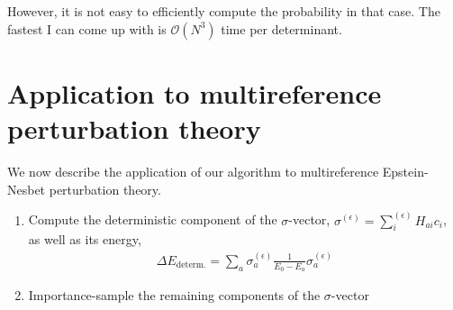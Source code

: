 \documentclass[english]{article}
\begin{document}
However, it is not easy to efficiently compute the probability in that case. The fastest I can come up with is $\mathcal{O}(N^3)$ time per determinant.


\section{Application to multireference perturbation theory}
We now describe the application of our algorithm to multireference Epstein-Nesbet perturbation theory. 

\begin{enumerate}
	\item Compute the deterministic component of the $\sigma$-vector, $\sigma^{(\epsilon)} = \sum^{(\epsilon)}_i H_{ai} c_i$, as well as its energy,
	\begin{eqnarray}
		\Delta E_{\textrm{determ.}} = \sum_a \sigma^{(\epsilon)}_a \frac{1}{E_0 - E_a} \sigma^{(\epsilon)}_a
	\end{eqnarray}
	\item Importance-sample the remaining components of the $\sigma$-vector
\end{enumerate}
\end{document}
